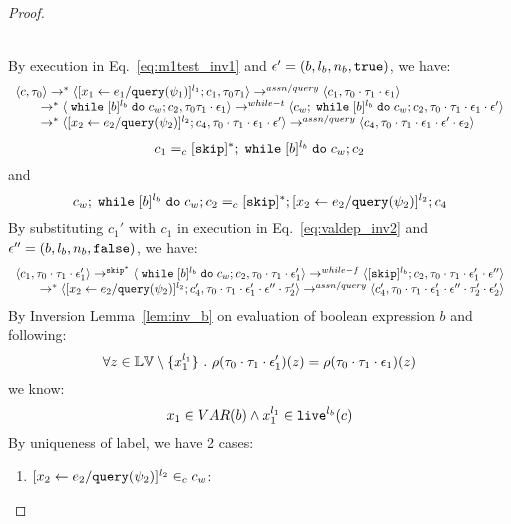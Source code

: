 {\begin{proof}
\begin{subproof}
\\
By execution in Eq.~\ref{eq:m1test_inv1} and $\mathtt{\epsilon}' = (b, l_b, n_b, \mathtt{true})$, we have:
\[
  \begin{array}{l}   
  \langle {c}, \mathtt{\tau}_0 \rangle \rightarrow^{*} 
  \langle [\mathrel{ {x}_1 \leftarrow e_1 / {\tt query}(\psi_1) }]^{l_1} ; {c}_1, \mathtt{\tau}_0 \mathtt{\tau}_1 \rangle  
  \rightarrow^{assn/query}
  \langle c_1, \mathtt{\tau}_0 \cdot \mathtt{\tau}_1 \cdot \mathtt{\epsilon}_1 \rangle 
  \\
  \qquad \rightarrow^{*} 
  \langle \;\mathtt{while}\; [b]^{l_b} \;\mathtt{do}\; c_w;{c}_2, 
  \mathtt{\tau}_0 \mathtt{\tau}_1 \cdot \mathtt{\epsilon}_1 \rangle 
  \rightarrow^{while-t} 
  \langle c_w;\;\mathtt{while}\; [b]^{l_b} \;\mathtt{do}\; c_w; c_2, \mathtt{\tau}_0 \cdot \mathtt{\tau}_1 \cdot \mathtt{\epsilon}_1 \cdot \mathtt{\epsilon}' \rangle 
  \\
  \qquad \rightarrow^{*} 
  \langle [\mathrel{ {x}_2 \leftarrow e_2 / {\tt query}(\psi_2) }]^{l_2};{c}_4, 
  \mathtt{\tau}_0 \cdot \mathtt{\tau}_1 \cdot \mathtt{\epsilon}_1 \cdot \mathtt{\epsilon}' \rangle 
  \rightarrow^{assn/query} 
  \langle {c}_4,  \mathtt{\tau}_0 \cdot \mathtt{\tau}_1 \cdot \mathtt{\epsilon}_1 \cdot \mathtt{\epsilon}' \cdot \mathtt{\epsilon}_2 \rangle 
  \end{array}
\]
% 
\[
  c_1 =_c [\mathtt{skip}]{}^*; \;\mathtt{while}\; [b]^{l_b} \;\mathtt{do}\; c_w;{c}_2
\]
and
\[
  c_w;\;\mathtt{while}\; [b]^{l_b} \;\mathtt{do}\; c_w; c_2 =_c [\mathtt{skip}]{}^*;[\mathrel{ {x}_2 \leftarrow e_2 / {\tt query}(\psi_2) }]^{l_2};{c}_4
\]
%
By substituting $c_1'$ with $c_1$ in execution in Eq.~\ref{eq:valdep_inv2} and $\mathtt{\epsilon}'' = (b, l_b, n_b, \mathtt{false})$, we have:
  \[
  \begin{array}{l}   
  \langle c_1, \mathtt{\tau}_0 \cdot \mathtt{\tau}_1 \cdot \mathtt{\epsilon}_1' \rangle 
  \rightarrow^{\mathtt{skip}^*} 
  \langle \;\mathtt{while}\; [b]^{l_b} \;\mathtt{do}\; c_w;{c}_2, \mathtt{\tau}_0 \cdot \mathtt{\tau}_1 \cdot \mathtt{\epsilon}_1' \rangle 
  \rightarrow^{while-f} 
  \langle [\mathtt{skip}]^{l_b};c_2, \mathtt{\tau}_0 \cdot \mathtt{\tau}_1 \cdot \mathtt{\epsilon}_1' \cdot \mathtt{\epsilon}'' \rangle 
  \\
  \qquad \rightarrow^{*} 
  \langle [\mathrel{ {x}_2 \leftarrow e_2 / {\tt query}(\psi_2) }]^{l_2};{c}_4', 
  \mathtt{\tau}_0 \cdot \mathtt{\tau}_1 \cdot \mathtt{\epsilon}_1' \cdot \mathtt{\epsilon}'' \cdot \mathtt{\tau}_2' \rangle
  \rightarrow^{assn/query} 
  \langle {c}_4',  \mathtt{\tau}_0 \cdot \mathtt{\tau}_1 \cdot \mathtt{\epsilon}_1' \cdot \mathtt{\epsilon}'' \cdot \mathtt{\tau}_2' \cdot \mathtt{\epsilon}_2' \rangle 
\end{array}
 \]
By Inversion Lemma~\ref{lem:inv_b} on evaluation of boolean expression $b$ and following: 
\[
  \forall z \in \mathbb{LV} \setminus \{x_1^{l_1}\} ~.~
  \rho(\mathtt{\tau}_0 \cdot \mathtt{\tau}_1 \cdot \mathtt{\epsilon}_1')(z) = \rho(\mathtt{\tau}_0 \cdot \mathtt{\tau}_1 \cdot \mathtt{\epsilon}_1)(z)
\]
we know:
\[
  x_1 \in VAR(b) \land x_1^{l_1} \in \mathtt{live}^{l_b}(c)
\]
%
 By uniqueness of label, we have 2 cases:
 \begin{enumerate}
 \item $[\mathrel{ {x}_2 \leftarrow e_2 / {\tt query}(\psi_2) }]^{l_2} \in_c c_w$:

\end{enumerate}
\end{subproof}
\end{proof}}
